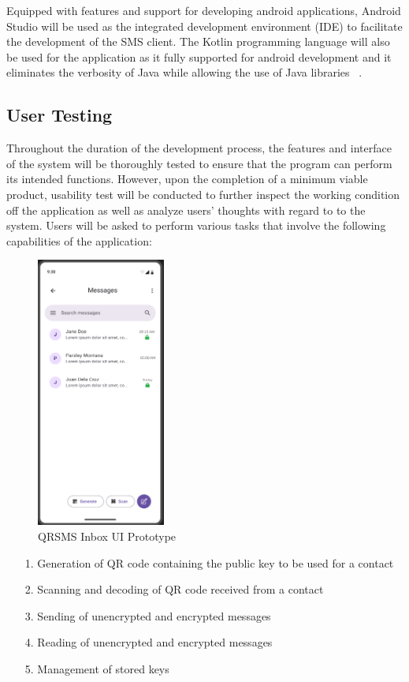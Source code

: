 \documentclass[journal]{./IEEE/IEEEtran}
\begin{document}
Equipped with features and support for developing android applications,
Android Studio will be used as the integrated development environment (IDE)
to facilitate the development of the SMS client.
The Kotlin programming language will also be used for the application as it
fully supported for android development and it eliminates the verbosity
of Java while allowing the use of Java libraries
~\cite{Moskala_Wojda_2017}.

\subsection{User Testing}
Throughout the duration of the development process, the features and interface
of the system will be thoroughly tested to ensure that the program can perform
its intended functions. However, upon the completion of a minimum viable
product, usability test will be conducted to further inspect the working
condition off the application as well as analyze users' thoughts with regard to
to the system. Users will be asked to perform various tasks that involve the
following capabilities of the application:

\begin{figure}
	\centering
	\includegraphics[height=3.5in]{./images/QRSMS_inbox.png}
	\caption{QRSMS Inbox UI Prototype}
	\label{QRSMSUI}
\end{figure}

\begin{itemize}
	\item[1.] Generation of QR code containing the public key to be used for
		a contact
	\item[2.] Scanning and decoding of QR code received from a contact
	\item[3.] Sending of unencrypted and encrypted messages
	\item[4.] Reading of unencrypted and encrypted messages
	\item[5.] Management of stored keys
\end{itemize}
\end{document}
